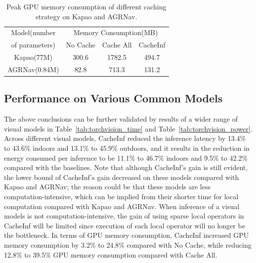 \begin{table}[htb]
    \renewcommand\arraystretch{0.95}
\centering
\begin{tabular}{c|c|c|c}
\toprule
Model(number & \multicolumn{3}{|c}{Memory Consumption(MB)} \\
 of parameters) & No Cache & Cache All & CacheInf \\
\midrule
Kapao(77M) & 300.6 & 1782.5 & 494.7\\
\hline
AGRNav(0.84M) & 82.8 & 713.3 & 131.2\\
\bottomrule
\end{tabular}

    \caption{Peak GPU memory consumption of different caching strategy on Kapao and AGRNav. }
    \label{tab:e2e_mem}
\end{table}

\subsection{Performance on Various Common Models}
The above conclusions can be further validated by results of a wider range of visual models in Table~\ref{tab:torchvision_time} and Table~\ref{tab:torchvision_power}.
Across different visual models, CacheInf reduced the inference latency by 13.4\% to 43.6\% indoors and 13.1\% to 45.9\% outdoors, and it results in the reduction in energy consumed per inference to be 11.1\% to 46.7\% indoors and 9.5\% to 42.2\%
compared with the baselines.
Note that although CacheInf's gain is still evident, the lower bound of CacheInf's gain decreased on these models compared with Kapao and AGRNav; the reason could be that these models are less computation-intensive, which can be implied from their shorter time for local computation compared with Kapao and AGRNav.
When inference of a visual models is not computation-intensive, the gain of using sparse local operators in CacheInf will be limited since execution of each local operator will no longer be the bottleneck.
In terms of GPU memory consumption, CacheInf increased GPU memory consumption by 3.2\% to 24.8\% compared with No Cache, while reducing 12.8\% to 39.5\% GPU memory consumption compared with Cache All.

